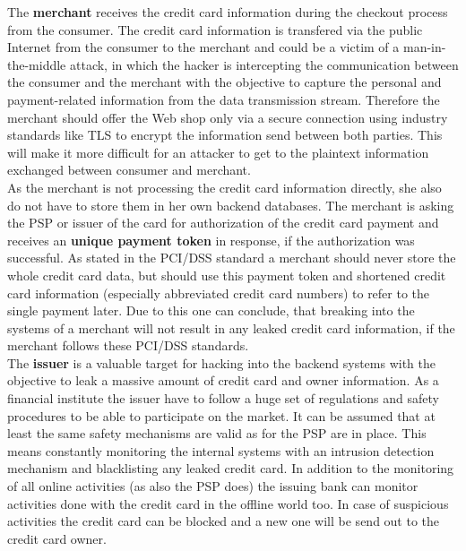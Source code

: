 The \textbf{merchant} receives the credit card information during the checkout process from the consumer. The credit card information is transfered via the public Internet from the consumer to the merchant and could be a victim of a man-in-the-middle attack, in which the hacker is intercepting the communication between the consumer and the merchant with the objective to capture the personal and payment-related information from the data transmission stream. Therefore the merchant should offer the Web shop only via a secure connection using industry standards like TLS to encrypt the information send between both parties. This will make it more difficult for an attacker to get to the plaintext information exchanged between consumer and merchant. \\

As the merchant is not processing the credit card information directly, she also do not have to store them in her own backend databases. The merchant is asking the \gls{PSP} or issuer of the card for authorization of the credit card payment and receives an \textbf{unique payment token} in response, if the authorization was successful. As stated in the PCI/DSS standard a merchant should never store the whole credit card data, but should use this payment token and shortened credit card information (especially abbreviated credit card numbers) to refer to the single payment later. Due to this one can conclude, that breaking into the systems of a merchant will not result in any leaked credit card information, if the merchant follows these PCI/DSS standards. \\

The \textbf{issuer} is a valuable target for hacking into the backend systems with the objective to leak a massive amount of credit card and owner information. As a financial institute the issuer have to follow a huge set of regulations and safety procedures to be able to participate on the market. It can be assumed that at least the same safety mechanisms are valid as for the \gls{PSP} are in place. This means constantly monitoring the internal systems with an intrusion detection mechanism and blacklisting any leaked credit card. In addition to the monitoring of all online activities (as also the \gls{PSP} does) the issuing bank can monitor activities done with the credit card in the offline world too. In case of suspicious activities the credit card can be blocked and a new one will be send out to the credit card owner. \\

